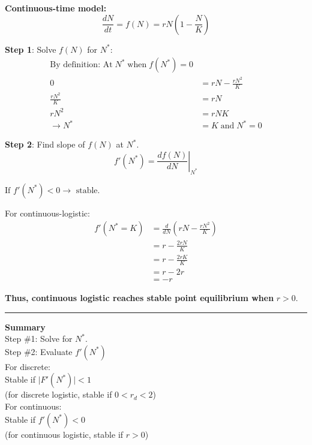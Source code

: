 \documentclass{article}
\newcommand{\ind}{\-\hspace{1cm}}
\begin{document}
\textbf{Continuous-time model:}
\begin{equation*}
\frac{dN}{dt}=f(N)=rN\left(1-\frac{N}{K}\right)
\end{equation*}

\textbf{Step 1}:  Solve $f(N)$ for $N^*$:
\begin{align*}
	\text{By definition:  At}\; N^{*} \; \text{when} \; f(N^*)=0&\\
	0 & = rN-\frac{rN^2}{K}\\
	\frac{rN^2}{K}&=rN\\
	rN^2&=rNK\\
	\to N^*& = K \; \text{and} \; N^* =0	
\end{align*}

\textbf{Step 2}:  Find slope of $f(N)$ at $N^*$.  
\begin{equation*}
	f'(N^*)=\left.\frac{d f(N)}{dN}\right\vert_{N^*}
\end{equation*}
\begin{center}
	$\boxed{\text{If } f'(N^*) < 0 \to \text{ stable.}}$
\end{center}
\ind \ind For continuous-logistic:\\
\begin{align*}
	f'(N^*=K)&=\frac{d}{dN}\left(rN-\frac{rN^2}{K}\right)\\
	&=r-\frac{2r N}{K}\\
	&= r- \frac{2r K}{K}\\
	&= r-2r\\
	&= -r
\end{align*}

\begin{center}
\textbf{Thus, continuous logistic reaches stable point equilibrium when} $r>0$.
\end{center}

\rule[0.5ex]{\linewidth}{1pt}

\textbf{Summary}\\
Step \#1: Solve for $N^*$.\\
Step \#2: Evaluate $f'(N^*)$\\
\ind \ind For discrete:\\
\ind \ind \ind Stable if $\vert F'(N^*) \vert <1$\\
\ind \ind \ind \ind (for discrete logistic, stable if $0<r_d<2$)\\
\ind \ind For continuous:\\
\ind \ind \ind Stable if $f'(N^*) <0$\\
\ind \ind \ind \ind (for continuous logistic, stable if $r>0$)\\
\end{document}

